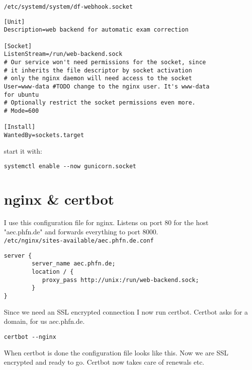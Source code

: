 \texttt{/etc/systemd/system/df-webhook.socket}

\begin{verbatim}
[Unit]
Description=web backend for automatic exam correction

[Socket]
ListenStream=/run/web-backend.sock
# Our service won't need permissions for the socket, since
# it inherits the file descriptor by socket activation
# only the nginx daemon will need access to the socket
User=www-data #TODO change to the nginx user. It's www-data
for ubuntu
# Optionally restrict the socket permissions even more.
# Mode=600

[Install]
WantedBy=sockets.target
\end{verbatim}

start it with:

\begin{verbatim}
systemctl enable --now gunicorn.socket
\end{verbatim}

\section{nginx \& certbot}

I use this configuration file for nginx.
Listens on port 80 for the host "aec.phfn.de" and forwards everything to port 8000.\\

\texttt{/etc/nginx/sites-available/aec.phfn.de.conf}

\begin{verbatim}
server {
        server_name aec.phfn.de;
        location / {
           proxy_pass http://unix:/run/web-backend.sock;
        }
}
\end{verbatim}

Since we need an SSL encrypted connection I now run certbot.
Certbot asks for a domain, for us aec.phfn.de.

\begin{verbatim}
certbot --nginx
\end{verbatim}

When certbot is done the configuration file looks like this.
Now we are SSL encrypted and ready to go.
Certbot now takes care of renewals etc.\\


